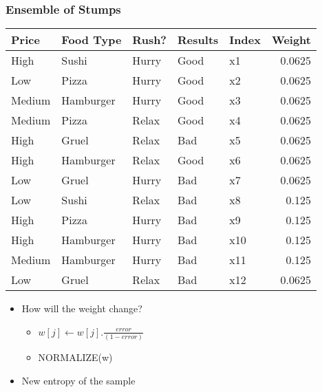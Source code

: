 \documentclass[compress, 9pt]{beamer}
\begin{document}
\begin{frame}
\frametitle{Ensemble of Stumps}
\label{sec-3-3}

\small

\begin{center}
\begin{tabular}{lllllr}
\hline
 Price   &  Food Type  &  Rush?  &  Results  &  Index  &  Weight  \\
\hline
 High    &  Sushi      &  Hurry  &  Good     &  x1     &  0.0625  \\
 Low     &  Pizza      &  Hurry  &  Good     &  x2     &  0.0625  \\
 Medium  &  Hamburger  &  Hurry  &  Good     &  x3     &  0.0625  \\
 Medium  &  Pizza      &  Relax  &  Good     &  x4     &  0.0625  \\
 High    &  Gruel      &  Relax  &  Bad      &  x5     &  0.0625  \\
 High    &  Hamburger  &  Relax  &  Good     &  x6     &  0.0625  \\
 Low     &  Gruel      &  Hurry  &  Bad      &  x7     &  0.0625  \\
 Low     &  Sushi      &  Relax  &  Bad      &  x8     &   0.125  \\
 High    &  Pizza      &  Hurry  &  Bad      &  x9     &   0.125  \\
 High    &  Hamburger  &  Hurry  &  Bad      &  x10    &   0.125  \\
 Medium  &  Hamburger  &  Hurry  &  Bad      &  x11    &   0.125  \\
 Low     &  Gruel      &  Relax  &  Bad      &  x12    &  0.0625  \\
\hline
\end{tabular}
\end{center}
\begin{itemize}

\item <1-> How will the weight change?
\label{sec-3-3-1}%
\begin{itemize}

\item <2-> $w[j] \leftarrow w[j]. \frac{error}{(1-error)}$
\label{sec-3-3-1-1}%

\item <2-> NORMALIZE(w)
\label{sec-3-3-1-2}%
\end{itemize} %

\item <3-> New entropy of the sample
\label{sec-3-3-2}%
\begin{itemize}


\end{itemize}
\end{itemize}
\end{frame}
\end{document}
